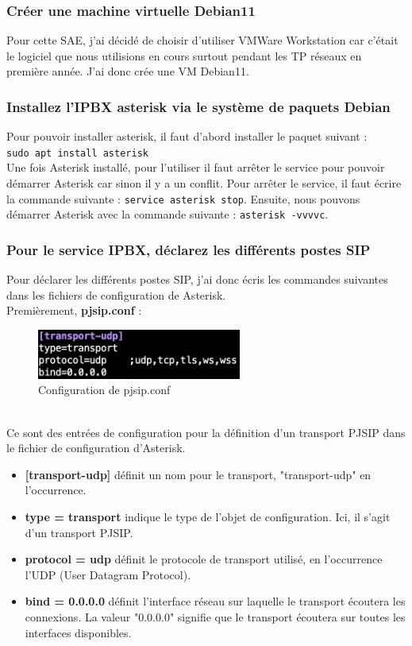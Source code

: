 \documentclass[12pt, a4paper]{article}
\begin{document}
	\subsubsection{Créer une machine virtuelle Debian11}
	Pour cette SAE, j'ai décidé de choisir d'utiliser VMWare Workstation car c'était
	le logiciel que nous utilisions en cours surtout pendant les TP réseaux en première
	année. J'ai donc crée une VM Debian11. 

	\subsubsection{Installez l'IPBX asterisk via le système de paquets Debian}
	Pour pouvoir installer asterisk, il faut d'abord installer le paquet suivant :\\
	
	\texttt{sudo apt install asterisk}\\

	Une fois Asterisk installé, pour l'utiliser il faut arrêter le service pour pouvoir
	démarrer Asterisk car sinon il y a un conflit. Pour arrêter le service, il faut
	écrire la commande suivante : \texttt{service asterisk stop}. Ensuite, nous
	pouvons démarrer Asterisk avec la commande suivante : \texttt{asterisk -vvvvc}.


	\subsubsection{Pour le service IPBX, déclarez les différents postes SIP}
	Pour déclarer les différents postes SIP, j'ai donc écris les commandes suivantes
	dans les fichiers de configuration de Asterisk.\\

	Premièrement, \textbf{pjsip.conf} :
	\begin{figure}[h]
		\centering
		\includegraphics[width=0.6\textwidth]{img/pjsip.png}
		\caption{Configuration de pjsip.conf}
		\label{fig:pjsip}
	\end{figure}\\
	Ce sont des entrées de configuration pour la définition d'un transport 
	PJSIP dans le fichier de configuration d'Asterisk.
	\begin{itemize}
		\item \textbf{[transport-udp]} définit un nom pour le transport, "transport-udp" en l'occurrence.
		\item \textbf{type = transport} indique le type de l'objet de configuration. Ici, il s'agit d'un transport PJSIP.
		\item \textbf{protocol = udp} définit le protocole de transport utilisé, en l'occurrence l'UDP (User Datagram Protocol).
		\item \textbf{bind = 0.0.0.0} définit l'interface réseau sur laquelle le transport écoutera les connexions. La valeur "0.0.0.0" signifie que le transport écoutera sur toutes les interfaces disponibles.
	\end{itemize}
\end{document}

